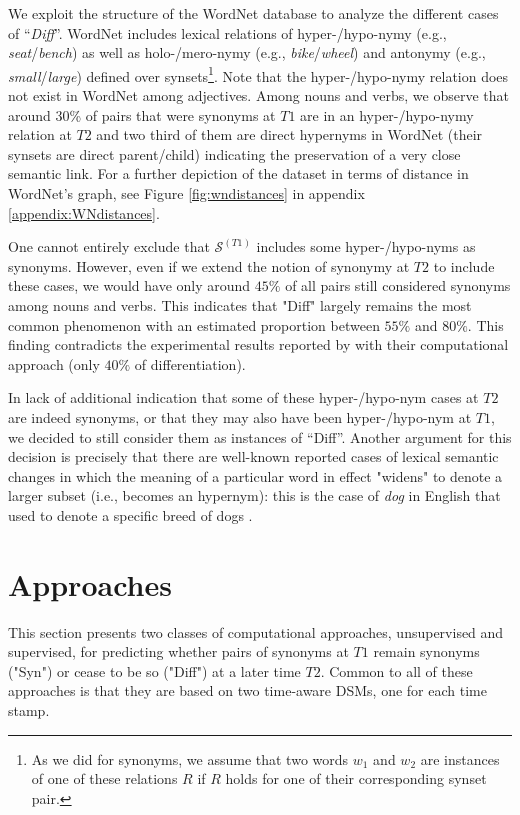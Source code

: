 \documentclass[11pt]{article}
\newcommand{\synonymsSet}{\mathcal{S}}
\newcommand{\firstTime}{T1}
\newcommand{\secondTime}{T2}
\begin{document}
We exploit the structure of the WordNet database to analyze the different cases of ``\textit{Diff}''. WordNet includes lexical relations of hyper-/hypo-nymy (e.g., \textit{seat}/\textit{bench}) as well as holo-/mero-nymy (e.g., \textit{bike}/\textit{wheel}) and antonymy (e.g., \textit{small}/\textit{large}) defined over synsets\footnote{As we did for synonyms, we assume that two words $w_1$ and $w_2$ are instances of one of these relations $R$ if $R$ holds for one of their corresponding synset pair.}. Note that the hyper-/hypo-nymy relation does not exist in WordNet among adjectives.   
Among nouns and verbs, we observe that around 30\% of pairs that were synonyms at $T1$ are in an hyper-/hypo-nymy relation at $T2$ and two third of them are direct hypernyms in WordNet (their synsets are direct parent/child) indicating the preservation of a very close semantic link. For a further depiction of the dataset in terms of distance in WordNet's graph, see Figure \ref{fig:wndistances} in appendix \ref{appendix:WNdistances}.


One cannot entirely exclude that $\synonymsSet^{(T1)}$ includes some hyper-/hypo-nyms as synonyms. However, even if we extend the notion of synonymy at $T2$ to include these cases, we would have only around $45\%$ of all pairs still considered synonyms among nouns and verbs. This indicates that "Diff" largely remains the most common phenomenon with an estimated proportion between $55\%$ and $80\%$. This finding contradicts the experimental results reported by \citet{xu-kemp-2015-evaluation} with their computational approach (only $40\%$ of differentiation). 

In lack of additional indication that some of these hyper-/hypo-nym cases at $T2$ are indeed synonyms, or that they may also have been hyper-/hypo-nym at $T1$, we decided to still consider them as instances of ``Diff''. Another argument for this decision is precisely that there are well-known reported cases of lexical semantic changes in which the meaning of a particular word in effect "widens" to denote a larger subset (i.e., becomes an hypernym): this is the case of \textit{dog} in English that used to denote a specific breed of dogs \citep{traugott_dasher_2001}. 


\section{Approaches}
\label{sec:approaches}
This section presents two classes of computational approaches, unsupervised and supervised, for predicting whether pairs of synonyms at $\firstTime$ remain synonyms ("Syn") or cease to be so ("Diff") at a later time $\secondTime$. Common to all of these approaches is that they are based on two time-aware DSMs, one for each time stamp.
\end{document}
